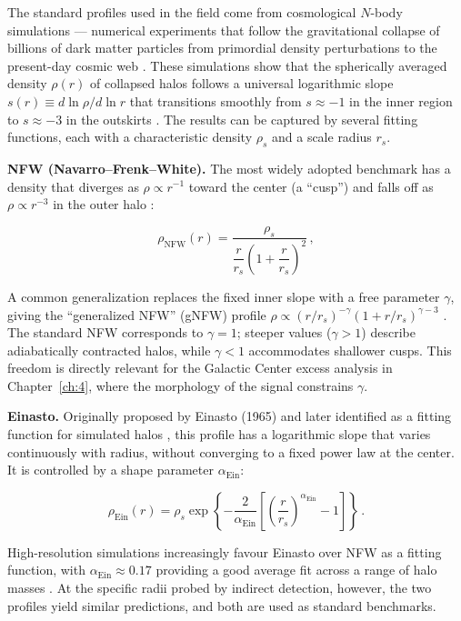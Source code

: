 The standard profiles used in the field come from cosmological $N$-body simulations --- numerical experiments that follow the gravitational collapse of billions of dark matter particles from primordial density perturbations to the present-day cosmic web \cite{Cirelli:2024ssz}.
These simulations show that the spherically averaged density $\rho(r)$ of collapsed halos follows a universal logarithmic slope $s(r) \equiv d\ln\rho / d\ln r$ that transitions smoothly from $s \approx -1$ in the inner region to $s \approx -3$ in the outskirts \cite{Cirelli:2024ssz}.
The results can be captured by several fitting functions, each with a characteristic density $\rho_s$ and a scale radius $r_s$.

\textbf{NFW (Navarro--Frenk--White).}
The most widely adopted benchmark has a density that diverges as $\rho \propto r^{-1}$ toward the center (a ``cusp'') and falls off as $\rho \propto r^{-3}$ in the outer halo \cite{Navarro:1996gj}:

\begin{equation}
	\rho_\text{NFW}(r) = \frac{\rho_s}{\dfrac{r}{r_s}\left(1 + \dfrac{r}{r_s}\right)^2} \,,
	\label{eq:nfw}
\end{equation}

A common generalization replaces the fixed inner slope with a free parameter $\gamma$, giving the ``generalized NFW'' (gNFW) profile $\rho \propto (r/r_s)^{-\gamma}(1 + r/r_s)^{\gamma - 3}$ \cite{Cirelli:2024ssz}.
The standard NFW corresponds to $\gamma = 1$; steeper values ($\gamma > 1$) describe adiabatically contracted halos, while $\gamma < 1$ accommodates shallower cusps.
This freedom is directly relevant for the Galactic Center excess analysis in Chapter~\ref{ch:4}, where the morphology of the signal constrains $\gamma$.

\textbf{Einasto.}
Originally proposed by Einasto (1965) and later identified as a fitting function for simulated halos \cite{Cirelli:2024ssz}, this profile has a logarithmic slope that varies continuously with radius, without converging to a fixed power law at the center.
It is controlled by a shape parameter $\alpha_\text{Ein}$:

\begin{equation}
	\rho_\text{Ein}(r) = \rho_s \exp\left\{ -\frac{2}{\alpha_\text{Ein}} \left[\left(\frac{r}{r_s}\right)^{\alpha_\text{Ein}} - 1\right]\right\} \,.
	\label{eq:einasto}
\end{equation}

High-resolution simulations increasingly favour Einasto over NFW as a fitting function, with $\alpha_\text{Ein} \approx 0.17$ providing a good average fit across a range of halo masses \cite{Cirelli:2024ssz}.
At the specific radii probed by indirect detection, however, the two profiles yield similar predictions, and both are used as standard benchmarks.


